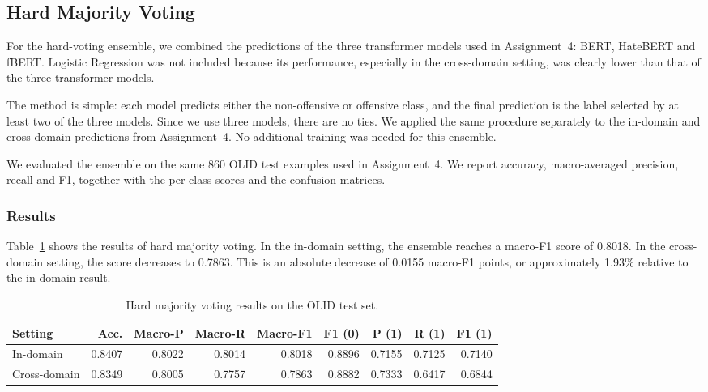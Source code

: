 
\subsection{Hard Majority Voting}

For the hard-voting ensemble, we combined the predictions of the three transformer models
used in Assignment~4: BERT, HateBERT and fBERT. Logistic Regression was not included because
its performance, especially in the cross-domain setting, was clearly lower than that of the
three transformer models.

The method is simple: each model predicts either the non-offensive or offensive class, and the
final prediction is the label selected by at least two of the three models. Since we use three
models, there are no ties. We applied the same procedure separately to the in-domain and
cross-domain predictions from Assignment~4. No additional training was needed for this
ensemble.

We evaluated the ensemble on the same 860 OLID test examples used in Assignment~4. We report
accuracy, macro-averaged precision, recall and F1, together with the per-class scores and the
confusion matrices.

\subsubsection{Results}

Table~\ref{tab:hard-voting-results} shows the results of hard majority voting. In the
in-domain setting, the ensemble reaches a macro-F1 score of 0.8018. In the cross-domain
setting, the score decreases to 0.7863. This is an absolute decrease of 0.0155 macro-F1
points, or approximately 1.93\% relative to the in-domain result.

\begin{table}[ht]
\centering
\caption{Hard majority voting results on the OLID test set.}
\label{tab:hard-voting-results}
\begin{tabular}{lrrrrrrrr}
\hline
Setting & Acc. & Macro-P & Macro-R & Macro-F1 & F1 (0) & P (1) & R (1) & F1 (1) \\
\hline
In-domain    & 0.8407 & 0.8022 & 0.8014 & 0.8018 & 0.8896 & 0.7155 & 0.7125 & 0.7140 \\
Cross-domain & 0.8349 & 0.8005 & 0.7757 & 0.7863 & 0.8882 & 0.7333 & 0.6417 & 0.6844 \\
\hline
\end{tabular}
\end{table}

